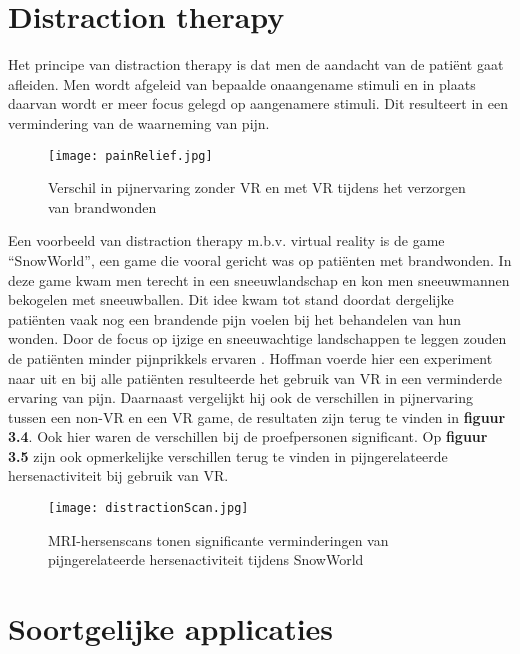 \section{Distraction therapy}
Het principe van distraction therapy is dat men de aandacht van de patiënt gaat afleiden. Men wordt afgeleid van bepaalde onaangename stimuli en in plaats daarvan wordt er meer focus gelegd op aangenamere stimuli. Dit resulteert in een vermindering van de waarneming van pijn. 

\begin{figure}[h]
    \centering
    \texttt{[image: painRelief.jpg]}
    \caption{ Verschil in pijnervaring zonder VR en met VR tijdens het verzorgen van brandwonden \autocite{Panjwani2017}}
\end{figure}

\newpage

Een voorbeeld van distraction therapy m.b.v. virtual reality is de game “SnowWorld”, een game die vooral gericht was op patiënten met brandwonden. In deze game kwam men terecht in een sneeuwlandschap en kon men sneeuwmannen bekogelen met sneeuwballen. Dit idee kwam tot stand doordat dergelijke patiënten vaak nog een brandende pijn voelen bij het behandelen van hun wonden. Door de focus op ijzige en sneeuwachtige landschappen te leggen zouden de patiënten minder pijnprikkels ervaren \autocite{Panjwani2017} .
Hoffman voerde hier een experiment naar uit en bij alle patiënten resulteerde het gebruik van VR in een verminderde ervaring van pijn. Daarnaast vergelijkt hij ook de verschillen in pijnervaring tussen een non-VR en een VR game, de resultaten zijn terug te vinden in \textbf{figuur 3.4}. Ook hier waren de verschillen bij de proefpersonen significant. Op \textbf{figuur 3.5} zijn ook opmerkelijke verschillen terug te vinden in pijngerelateerde hersenactiviteit bij gebruik van VR.

\begin{figure}[h]
    \centering
    \texttt{[image: distractionScan.jpg]}
    \caption{MRI-hersenscans tonen significante verminderingen van pijngerelateerde hersenactiviteit tijdens SnowWorld \autocite{Washington2017}}
\end{figure}

\section{Soortgelijke applicaties}
